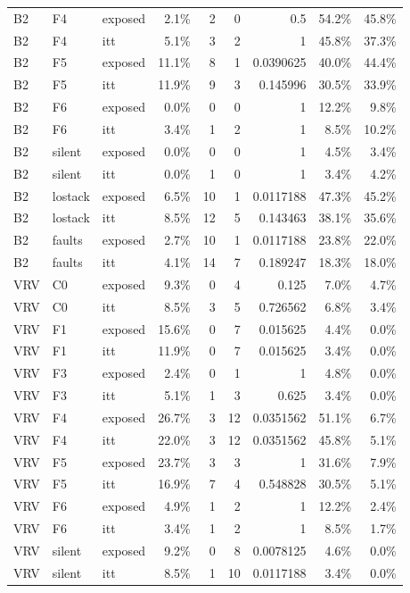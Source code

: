 \begin{tabular}{lllrrrrrr}
B2 & F4 & exposed & 2.1\% & 2 & 0 & 0.5 & 54.2\% & 45.8\% \\
B2 & F4 & itt & 5.1\% & 3 & 2 & 1 & 45.8\% & 37.3\% \\
B2 & F5 & exposed & 11.1\% & 8 & 1 & 0.0390625 & 40.0\% & 44.4\% \\
B2 & F5 & itt & 11.9\% & 9 & 3 & 0.145996 & 30.5\% & 33.9\% \\
B2 & F6 & exposed & 0.0\% & 0 & 0 & 1 & 12.2\% & 9.8\% \\
B2 & F6 & itt & 3.4\% & 1 & 2 & 1 & 8.5\% & 10.2\% \\
B2 & silent & exposed & 0.0\% & 0 & 0 & 1 & 4.5\% & 3.4\% \\
B2 & silent & itt & 0.0\% & 1 & 0 & 1 & 3.4\% & 4.2\% \\
B2 & lostack & exposed & 6.5\% & 10 & 1 & 0.0117188 & 47.3\% & 45.2\% \\
B2 & lostack & itt & 8.5\% & 12 & 5 & 0.143463 & 38.1\% & 35.6\% \\
B2 & faults & exposed & 2.7\% & 10 & 1 & 0.0117188 & 23.8\% & 22.0\% \\
B2 & faults & itt & 4.1\% & 14 & 7 & 0.189247 & 18.3\% & 18.0\% \\
VRV & C0 & exposed & 9.3\% & 0 & 4 & 0.125 & 7.0\% & 4.7\% \\
VRV & C0 & itt & 8.5\% & 3 & 5 & 0.726562 & 6.8\% & 3.4\% \\
VRV & F1 & exposed & 15.6\% & 0 & 7 & 0.015625 & 4.4\% & 0.0\% \\
VRV & F1 & itt & 11.9\% & 0 & 7 & 0.015625 & 3.4\% & 0.0\% \\
VRV & F3 & exposed & 2.4\% & 0 & 1 & 1 & 4.8\% & 0.0\% \\
VRV & F3 & itt & 5.1\% & 1 & 3 & 0.625 & 3.4\% & 0.0\% \\
VRV & F4 & exposed & 26.7\% & 3 & 12 & 0.0351562 & 51.1\% & 6.7\% \\
VRV & F4 & itt & 22.0\% & 3 & 12 & 0.0351562 & 45.8\% & 5.1\% \\
VRV & F5 & exposed & 23.7\% & 3 & 3 & 1 & 31.6\% & 7.9\% \\
VRV & F5 & itt & 16.9\% & 7 & 4 & 0.548828 & 30.5\% & 5.1\% \\
VRV & F6 & exposed & 4.9\% & 1 & 2 & 1 & 12.2\% & 2.4\% \\
VRV & F6 & itt & 3.4\% & 1 & 2 & 1 & 8.5\% & 1.7\% \\
VRV & silent & exposed & 9.2\% & 0 & 8 & 0.0078125 & 4.6\% & 0.0\% \\
VRV & silent & itt & 8.5\% & 1 & 10 & 0.0117188 & 3.4\% & 0.0\% \\

\end{tabular}
